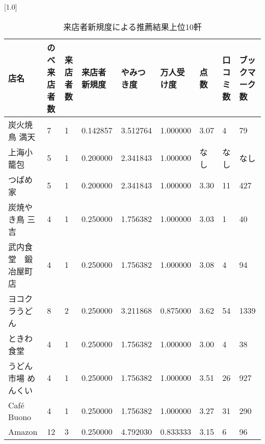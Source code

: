 \begin{table}[H]
\centering
\caption{来店者新規度による推薦結果上位10軒}
\label{table::VN}
\small
\scalebox{0.7}[1.0]{
\begin{tabular}{|l|l|l|l|l|l|l|l|l|}
\hline
店名         & のべ来店者数 & 来店者数 & 来店者新規度   & やみつき度    & 万人受け度    & 点数    & 口コミ数  & ブックマーク数 \\ \hline
炭火焼鳥 満天    & 7      & 1    & 0.142857 & 3.512764 & 1.000000 & 3.07  & 4     & 79      \\ \hline
上海小籠包      & 5      & 1    & 0.200000 & 2.341843 & 1.000000 & なし & なし & なし   \\ \hline
つばめ家       & 5      & 1    & 0.200000 & 2.341843 & 1.000000 & 3.30  & 11    & 427     \\ \hline
炭焼やき鳥 三吉   & 4      & 1    & 0.250000 & 1.756382 & 1.000000 & 3.03  & 1     & 40      \\ \hline
武内食堂　鍛冶屋町店 & 4      & 1    & 0.250000 & 1.756382 & 1.000000 & 3.08  & 4     & 94      \\ \hline
ヨコクラうどん    & 8      & 2    & 0.250000 & 3.211868 & 0.875000 & 3.62  & 54    & 1339    \\ \hline
ときわ食堂      & 4      & 1    & 0.250000 & 1.756382 & 1.000000 & 3.00  & 4     & 38      \\ \hline
うどん市場 めんくい & 4      & 1    & 0.250000 & 1.756382 & 1.000000 & 3.51  & 26    & 927     \\ \hline
Café Buono & 4      & 1    & 0.250000 & 1.756382 & 1.000000 & 3.27  & 31    & 290     \\ \hline
Amazon     & 12     & 3    & 0.250000 & 4.792030 & 0.833333 & 3.15  & 6     & 96      \\ \hline
\end{tabular}
}
\end{table}
